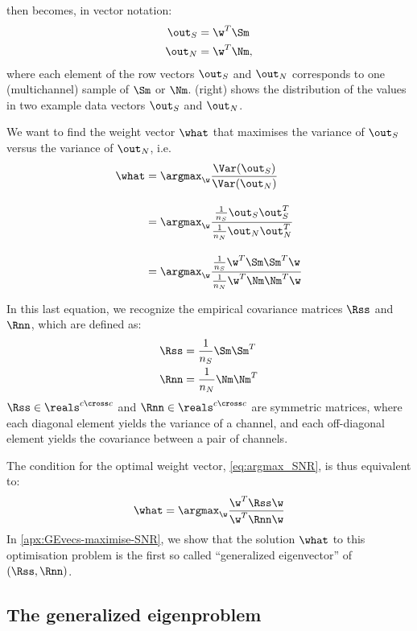  then becomes, in vector notation:
%
\begin{align*}
\out_S &= \w^T \Sm \\
\out_N &= \w^T \Nm,
\end{align*}
where each element of the row vectors $\out_S$ and $\out_N$ corresponds to one (multichannel) sample of $\Sm$ or $\Nm$.  (right) shows the distribution of the values in two example data vectors $\out_S$ and $\out_N$.

We want to find the weight vector $\what$ that maximises the variance of $\out_S$ versus the variance of $\out_N$, i.e.
%
\begin{align}
\what &= \argmax_{\w} \frac{\Var(\out_S)}
                           {\Var(\out_N)}  \label{eq:argmax_SNR} \\[1em]
      &= \argmax_{\w} 
         \frac{\frac{1}{n_S} \out_S \out_S^T}
              {\frac{1}{n_N} \out_N \out_N^T}   \nonumber \\[1em]
      &= \argmax_{\w}
         \frac{\frac{1}{n_S} \w^T \Sm \Sm^T \w}
              {\frac{1}{n_N} \w^T \Nm \Nm^T \w}  \nonumber
\end{align}

In this last equation, we recognize the empirical covariance matrices $\Rss$ and $\Rnn$, which are defined as:
%
\begin{align}
\Rss &= \frac{1}{n_S} \Sm \Sm^T \label{eq:covariance_S}\\
\Rnn &= \frac{1}{n_N} \Nm \Nm^T \label{eq:covariance_N}
\end{align}
%
$\Rss \in \reals^{c \cross c}$ and $\Rnn \in \reals^{c \cross c}$ are symmetric matrices, where each diagonal element yields the variance of a channel, and each off-diagonal element yields the covariance between a pair of channels.

The condition for the optimal weight vector, \cref{eq:argmax_SNR}, is thus equivalent to:
%
\begin{equation}
\label{eq:argmax_R}
\what = \argmax_{\w}
       \frac{\w^T \Rss \w}
            {\w^T \Rnn \w}
\end{equation}
%
In \cref{apx:GEvecs-maximise-SNR}, we show that the solution $\what$ to this optimisation problem is the first so called ``generalized eigenvector'' of $(\Rss, \Rnn)$.



\subsection{The generalized eigenproblem}
\label{sec:generalized-eigenproblem}

